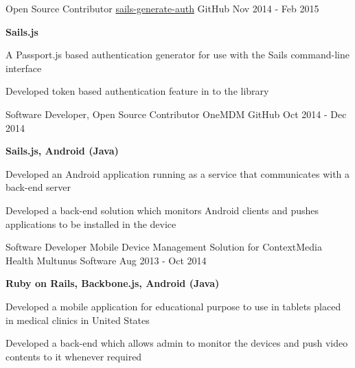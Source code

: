 \begin{cventries}
{\begin{cvitems}
      \end{cvitems}
    }
  \cventry
    {Open Source Contributor}
    {\href{https://github.com/kasperisager/sails-generate-auth}{sails-generate-auth}}
    {GitHub}
    {Nov 2014 - Feb 2015}
    {
      \begin{cvitems}
        \item {\textbf{Sails.js}}
        \item {A Passport.js based authentication generator for use with the Sails command-line interface}
        \item {Developed token based authentication feature in to the library}
      \end{cvitems}
    }
  \cventry
    {Software Developer, Open Source Contributor}
    {OneMDM}
    {GitHub}
    {Oct 2014 - Dec 2014}
    {
      \begin{cvitems}
        \item {\textbf{Sails.js, Android (Java)}}
        \item {Developed an Android application running as a service that communicates with a back-end server}
        \item {Developed a back-end solution which monitors Android clients and pushes applications to be installed in the device}
      \end{cvitems} 
    }
  \cventry
    {Software Developer}
    {Mobile Device Management Solution for ContextMedia Health}
    {Multunus Software}
    {Aug 2013 - Oct 2014}
    {
      \begin{cvitems}
        \item {\textbf{Ruby on Rails, Backbone.js, Android (Java)}}
        \item {Developed a mobile application for educational purpose to use in tablets placed in medical clinics in United States}
        \item {Developed a back-end which allows admin to monitor the devices and push video contents to it whenever required}

\end{cvitems}}
\end{cventries}

